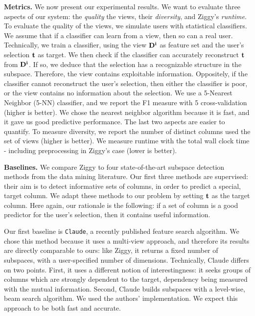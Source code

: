 \textbf{Metrics.} We now present our experimental results. We want to evaluate three aspects of
our system: the \emph{quality} the views, their \emph{diversity}, and Ziggy's
\emph{runtime}. To evaluate the quality of the views, we simulate users with
statistical classifiers. We assume that if a classifier can learn from a view,
then so can a real user. Technically, we train a classifier, using the view
$\bf{D}^i$ as feature set and the user's selection $\bf{t}$ as target. We then
check if the classifier can accurately reconstruct $\bf{t}$ from $\bf{D}^i$. If
so, we deduce that the selection has a recognizable structure in the subspace.
Therefore, the view contains exploitable information. Oppositely, if the
classifier cannot reconstruct the user's selection, then either the classifier
is poor, or the view contains no information about the selection. We use a
5-Nearest Neighbor (5-NN) classifier, and we report the F1 measure with 5
cross-validation (higher is better). We chose the nearest neighbor algorithm
because it is fast, and it gave us good predictive performance. The last two
aspects are easier to quantify. To measure diversity, we report the number of
distinct columns used the set of views (higher is better). We measure runtime
with the total wall clock time - including preprocessing in Ziggy's case (lower is better).

\textbf{Baselines.} We compare Ziggy to four state-of-the-art subspace detection methods from the
data mining literature. Our first three methods are supervised: their aim is to
detect informative sets of columns, in order to predict a special, target
column. We adapt these methods to our problem by setting $\bf{t}$ as the target
column. Here again, our rationale is the following: if a set of column is a good
predictor for the user's selection, then it contains useful information.

Our first baseline is \texttt{Claude}, a recently published feature search
algorithm. We chose this method because it uses a multi-view approach, and
therefore its results are directly comparable to ours: like Ziggy, it returns a
fixed number of subspaces, with a user-specified number of dimensions.
Technically, Claude differs on two points. First, it uses a different notion of
interestingness: it seeks groups of columns which are strongly dependent to the
target, dependency being measured with the mutual information. Second, Claude
builds subspaces with a level-wise, beam search algorithm. We used the authors'
implementation.  We expect this approach to be both fast and accurate.

